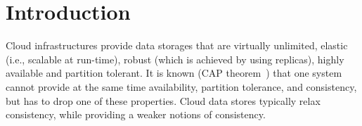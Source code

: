 
\section{Introduction}

Cloud infrastructures provide data storages that are virtually unlimited, elastic (i.e., scalable at run-time), 
robust (which is achieved by using replicas),  highly available and partition tolerant. 
It is known (CAP theorem~\cite{CAP}) that one system cannot provide at the same time availability, 
partition tolerance, and consistency, but has to drop one of these properties. Cloud data stores typically 
relax consistency, while providing a weaker  notions of consistency. 


